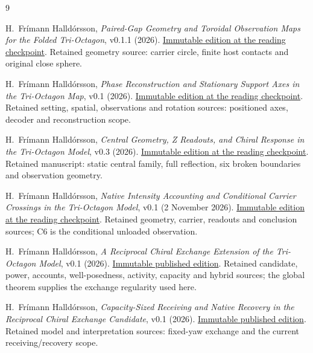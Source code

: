 \clearpage
\begin{thebibliography}{9}
\raggedright
{} H.~Frímann Halldórsson,
\emph{Paired-Gap Geometry and Toroidal Observation Maps for the Folded Tri-Octagon}, v0.1.1 (2026).
\href{https://github.com/pzychozen/trioctagon-physics/tree/c3ee366bd6195bd7fa77efd0321214af4c2dc173/SRG_REDISCOVERY/PAPERS/PAIRED_GAP_GEOMETRY_OBSERVATION/publication/v0.1.1}{Immutable edition at the reading checkpoint}.
Retained geometry source: carrier circle, finite host contacts and original close sphere.

 H.~Frímann Halldórsson,
\emph{Phase Reconstruction and Stationary Support Axes in the Tri-Octagon Map}, v0.1 (2026).
\href{https://github.com/pzychozen/trioctagon-physics/tree/c3ee366bd6195bd7fa77efd0321214af4c2dc173/papers/PHASE_RECONSTRUCTION_AND_STATIONARY_SUPPORT_AXES/publication/v0.1}{Immutable edition at the reading checkpoint}.
Retained setting, spatial, observations and rotation sources: positioned axes, decoder and reconstruction scope.

 H.~Frímann Halldórsson,
\emph{Central Geometry, Z Readouts, and Chiral Response in the Tri-Octagon Model}, v0.3 (2026).
\href{https://github.com/pzychozen/trioctagon-physics/tree/c3ee366bd6195bd7fa77efd0321214af4c2dc173/papers/CENTRAL_GEOMETRY_Z_CHIRAL_RESPONSE/publication/v0.3}{Immutable edition at the reading checkpoint}.
Retained manuscript: static central family, full reflection, six broken boundaries and observation geometry.

 H.~Frímann Halldórsson,
\emph{Native Intensity Accounting and Conditional Carrier Crossings in the Tri-Octagon Model}, v0.1 (2 November 2026).
\href{https://github.com/pzychozen/trioctagon-physics/tree/c3ee366bd6195bd7fa77efd0321214af4c2dc173/papers/NATIVE_INTENSITY_AND_CONDITIONAL_CARRIER_CROSSINGS/publication/v0.1}{Immutable edition at the reading checkpoint}.
Retained geometry, carrier, readouts and conclusion sources; C6 is the conditional unloaded observation.

 H.~Frímann Halldórsson,
\emph{A Reciprocal Chiral Exchange Extension of the Tri-Octagon Model}, v0.1 (2026).
\href{https://github.com/pzychozen/trioctagon-physics/tree/273b1a6faaab19ea58748d00576439166eeef9ab/papers/RECIPROCAL_CHIRAL_EXCHANGE/publication/v0.1}{Immutable published edition}.
Retained candidate, power, accounts, well-posedness, activity, capacity and hybrid sources; the global theorem supplies the exchange regularity used here.

 H.~Frímann Halldórsson,
\emph{Capacity-Sized Receiving and Native Recovery in the Reciprocal Chiral Exchange Candidate}, v0.1 (2026).
\href{https://github.com/pzychozen/trioctagon-physics/tree/34bf6c6e4e18adcc177ac700359fda16cf4d772d/papers/NATIVE_CAPACITY_RECEIVING_RECOVERY/publication/v0.1}{Immutable published edition}.
Retained model and interpretation sources: fixed-yaw exchange and the current receiving/recovery scope.


\end{thebibliography}
